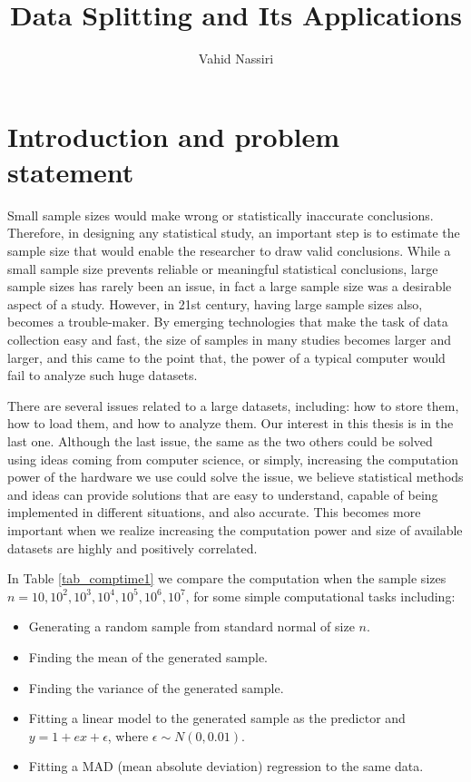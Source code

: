 \documentclass[11pt,a5paper,twoside]{book}
\title{Data Splitting and Its Applications}
\author{Vahid Nassiri}
\newcommand{\clearemptydoublepage}%
        {\newpage{\pagestyle{empty}\cleardoublepage}}
\begin{document}
\pagestyle{fancy}

\maketitle
 \frontmatter
\tableofcontents
\listoffigures
\listoftables


\clearemptydoublepage
\mainmatter

\clearemptydoublepage

\chapter[Introduction]{Introduction and problem statement}
\label{sec_intro1}

Small sample sizes would make wrong or statistically inaccurate conclusions. Therefore, in designing any statistical study, an important step is to estimate the sample size that would enable the researcher to draw valid conclusions. While a small sample size prevents reliable or meaningful statistical conclusions, large sample sizes has rarely been an issue, in fact a large sample size was a desirable aspect of a study. However, in 21st century, having large sample sizes also, becomes a trouble-maker. By emerging technologies that make the task of data collection easy and fast, the size of samples in many studies becomes larger and larger, and this came to the point that, the power of a typical computer would fail to analyze such huge datasets. 

There are several issues related to a large datasets, including: how to store them, how to load them, and how to analyze them. Our interest in this thesis is in the last one. Although the last issue, the same as the two others could be solved using ideas coming from computer science, or simply, increasing the computation power of the hardware we use could solve the issue, we believe statistical methods and ideas can provide solutions that are easy to understand, capable of being implemented in different situations, and also accurate. This becomes more important when we realize increasing the computation power and size of available datasets are highly and positively correlated. 

In Table \ref{tab_comptime1} we compare the computation when the sample sizes $n=10, 10^2, 10^3, 10^4, 10^5, 10^6, 10^7$, for some simple computational tasks including:

\begin{itemize}
\item Generating a random sample from standard normal of size $n$.
\item Finding the mean of the generated sample.
\item Finding the variance of the generated sample.
\item Fitting a linear model to the generated sample as the predictor and $y = 1 + ex + \epsilon$, where $\epsilon\sim N(0, 0.01)$.
\item Fitting a MAD (mean absolute deviation) regression to the same data.
\end{itemize}
\end{document}
